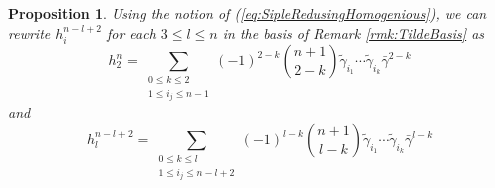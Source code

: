 \documentclass{article}
\theoremstyle{plain}
\newtheorem{prop}[thm]{Proposition}
\theoremstyle{definition}
\numberwithin{thm}{section}
\begin{document}
			\begin{prop}
				Using the notion of (\ref{eq:SipleRedusingHomogenious}),
				we can rewrite $h^{n-l+2}_i$ for each $3\leq l \leq n$ in the basis of Remark \ref{rmk:TildeBasis} as
				\begin{equation*}
					h^{n}_2=\sum_{\substack{0\leq k \leq 2 \\ 1\leq i_j \leq n-1}}
					{(-1)^{2-k} \binom{n+1}{2-k} \tilde{\gamma}_{i_1}\cdots\tilde{\gamma}_{i_{k}}\bar{\gamma}^{2-k}}
				\end{equation*}
				and
				\begin{equation*}
					h^{n-l+2}_l=\sum_{\substack{0\leq k \leq l \\ 1\leq i_j \leq n-l+2}}
					{(-1)^{l-k} \binom{n+1}{l-k} \tilde{\gamma}_{i_1}\cdots\tilde{\gamma}_{i_{k}}\bar{\gamma}^{l-k}}
				\end{equation*}
			\end{prop}
\end{document}
